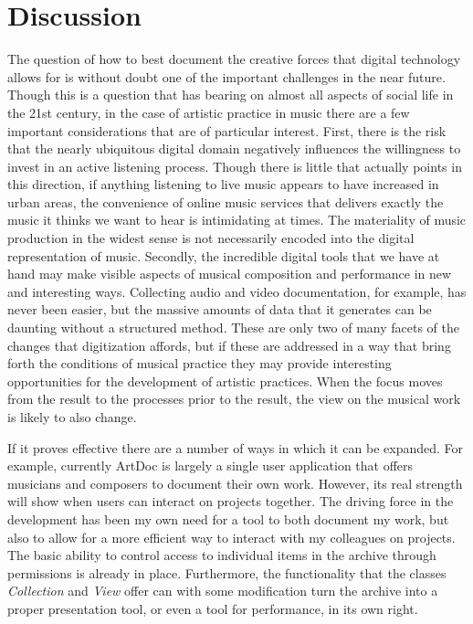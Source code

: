 \documentclass[,a4paper]{llncs}
\begin{document}
\section{Discussion}
\label{sec:discussion}
The question of how to best document the creative forces that digital technology allows for is without doubt one of the important challenges in the near future. Though this is a question that has bearing on almost all aspects of social life in the 21st century, in the case of artistic practice in music there are a few important considerations that are of particular interest. First, there is the risk that the nearly ubiquitous digital domain negatively influences the willingness to invest in an active listening process. Though there is little that actually points in this direction, if anything listening to live music appears to have increased in urban areas, the convenience of online music services that delivers exactly the music it thinks we want to hear is intimidating at times. The materiality of music production in the widest sense is not necessarily encoded into the digital representation of music. Secondly, the incredible digital tools that we have at hand may make visible aspects of musical composition and performance in new and interesting ways. Collecting audio and video documentation, for example, has never been easier, but the massive amounts of data that it generates can be daunting without a structured method. These are only two of many facets of the changes that digitization affords, but if these are addressed in a way that bring forth the conditions of musical practice they may provide interesting opportunities for the development of artistic practices. When the focus moves from the result to the processes prior to the result, the view on the musical work is likely to also change. 

If it proves effective there are a number of ways in which it can be expanded. For example, currently ArtDoc is largely a single user application that offers musicians and composers to document their own work. However, its real strength will show when users can interact on projects together. The driving force in the development has been my own need for a tool to both document my work, but also to allow for a more efficient way to interact with my colleagues on projects. The basic ability to control access to individual items in the archive through permissions is already in place. Furthermore, the functionality that the classes \emph{Collection} and \emph{View} offer can with some modification turn the archive into a proper presentation tool, or even a tool for performance, in its own right.
\end{document}
